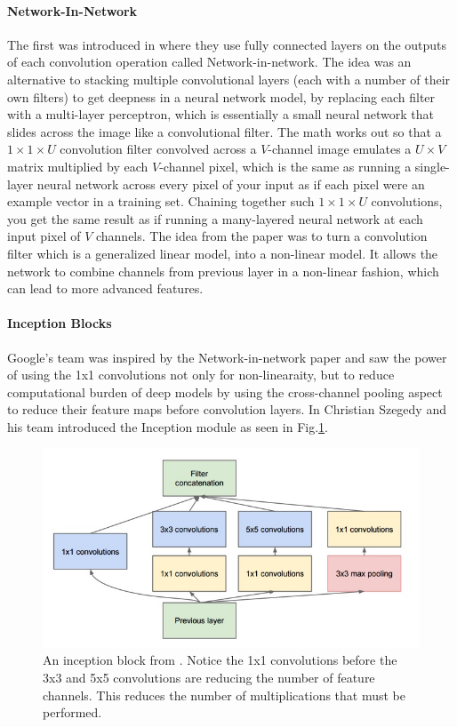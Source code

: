\paragraph{Network-In-Network} 
The first was introduced in \cite{lin2013network} where they use fully connected layers on the outputs of each convolution operation called Network-in-network. 
The idea was an alternative to stacking multiple convolutional layers (each with a number of their own filters) to get deepness in a neural network model, by replacing each filter with a multi-layer perceptron, which is essentially a small neural network that slides across the image like a convolutional filter. 
The math works out so that a $1\times 1\times U$ convolution filter convolved across a $V$-channel image emulates a $U\times V$ matrix multiplied by each $V$-channel pixel, which is the same as running a single-layer neural network across every pixel of your input as if each pixel were an example vector in a training set. 
Chaining together such $1\times 1\times U$ convolutions, you get the same result as if running a many-layered neural network at each input pixel of $V$ channels. 
The idea from the paper was to turn a convolution filter which is a generalized linear model, into a non-linear model. 
It allows the network to combine channels from previous layer in a non-linear fashion, which can lead to more advanced features.

\paragraph{Inception Blocks}
Google's team was inspired by the Network-in-network paper and saw the power of using the 1x1 convolutions not only for non-linearaity, but to reduce computational burden of deep models by using the cross-channel pooling aspect to reduce their feature maps before convolution layers. 
In \cite{szegedy2015going} Christian Szegedy and his team introduced the Inception module as seen in Fig.\ref{f:inceptionblock}. 
\begin{figure}[h!]
	\centering
		\includegraphics[width=1.0\textwidth]{figures/inceptionblock.png}
	\caption{An inception block from \cite{szegedy2015going}. Notice the 1x1 convolutions before the 3x3 and 5x5 convolutions are reducing the number of feature channels. This reduces the number of multiplications that must be performed.}
	\label{f:inceptionblock}
\end{figure}

